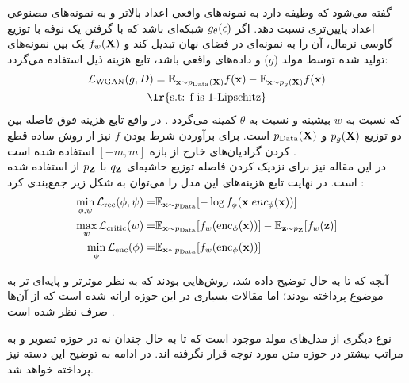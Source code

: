 گفته می‌شود که وظیفه دارد به نمونه‌های واقعی اعداد بالاتر و به نمونه‌های مصنوعی اعداد پایین‌تری نسبت دهد.
اگر $g_\theta({\bf \epsilon})$ شبکه‌ای باشد که با گرفتن یک نوفه با توزیع گاوسی نرمال، آن را به نمونه‌ای در فضای نهان تبدیل کند و $f_w({\bf X})$ یک \critic{} بین نمونه‌های تولید شده توسط مولد ($g$) و داده‌های واقعی باشد، تابع هزینه ذیل استفاده می‌گردد:
\begin{gather}
	\mathcal{L}_\text{WGAN} (g, D)=
	\expected_{\bff{x} \sim p_\text{Data}(\bff{X})} f(\bff{x})
	- \expected_{\bff{x} \sim p_g(\bff{X})} f(\bff{x})
	\\
	\text{\lr{s.t: f is 1-Lipschitz}} \nonumber
\end{gather}
که نسبت به $w$ بیشینه و نسبت به $\theta$ کمینه می‌گردد \cite{wgan}. در واقع تابع هزینه فوق فاصله \wasser{} بین دو توزیع $p_g({\bf X})$ و $p_\text{Data}({\bf X})$ است. برای برآوردن شرط  بودن $f$ نیز از روش ساده قطع کردن گرادیان‌های خارج از بازه $[-m, m]$ استفاده شده است \cite{wae_text_reg}.
\\
در این مقاله نیز برای نزدیک کردن فاصله توزیع حاشیه‌ای $q_{\bf Z}$ با $p_{\bf Z}$ از \wgan{} استفاده شده است. در نهایت تابع هزینه‌های این مدل را می‌توان به شکل زیر جمع‌بندی کرد \cite{wae_text_reg}:
\begin{align}
	\min_{\phi, \psi} {\mathcal{L}}_\text{rec}(\phi, \psi) = & \mathbb E_{{\bf x} \sim p_\text{Data}} [- \log f_\phi({\bf x}|enc_\phi({\bf x}))] \nonumber
	\\
	\max_{w} {\mathcal{L}}_\text{critic}(w) =                &
	\mathbb E_{{\bf x} \sim p_\text{Data}} [f_w(\text{enc}_\phi({\bf x}))]
	-\mathbb E_{{\bf z} \sim p_{\bf Z}} [f_w({\bf z})] \nonumber
	\\
	\min_{\phi} {\mathcal{L}}_\text{enc}(\phi) =                   &
	\mathbb E_{{\bf x} \sim p_\text{Data}} [f_w(\text{enc}_\phi({\bf x}))]
\end{align}


آنچه که تا به حال توضیح داده شد، روش‌هایی بودند که به نظر موثرتر و پایه‌ای تر به موضوع پرداخته بودند؛ اما مقالات بسیاری در این حوزه ارائه شده است که از آن‌ها صرف نظر شده است \cite{vae_decflow, vae_hybrid, vae_multilevel, vae_spherical}.

نوع دیگری از مدل‌های مولد موجود است که تا به حال چندان نه در حوزه تصویر و به مراتب بیشتر در حوزه متن مورد توجه قرار نگرفته اند. در ادامه به توضیح این دسته نیز پرداخته خواهد شد.
